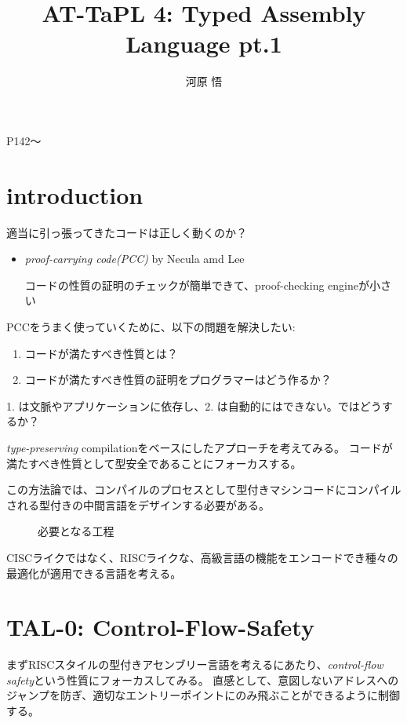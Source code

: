 \documentclass[a4paper,oneside]{ltjsarticle}
\title{AT-TaPL 4: Typed Assembly Language pt.1}
\author{河原 悟}
\begin{document}
\maketitle
P142〜

\setcounter{section}{-1}
\section{introduction}
適当に引っ張ってきたコードは正しく動くのか？
\begin{itemize}
	\item \textit{proof-carrying code(PCC)} by Necula amd Lee

		コードの性質の証明のチェックが簡単できて、proof-checking engineが小さい
\end{itemize}

PCCをうまく使っていくために、以下の問題を解決したい:

\begin{enumerate}
	\item コードが満たすべき性質とは？
	\item コードが満たすべき性質の証明をプログラマーはどう作るか？
\end{enumerate}

1. は文脈やアプリケーションに依存し、2. は自動的にはできない。ではどうするか？

\textit{type-preserving} compilationをベースにしたアプローチを考えてみる。
コードが満たすべき性質として型安全であることにフォーカスする。

この方法論では、コンパイルのプロセスとして型付きマシンコードにコンパイルされる型付きの中間言語をデザインする必要がある。
\begin{figure}[h]
	\centering
	\caption{必要となる工程}
\end{figure}

CISCライクではなく、RISCライクな、高級言語の機能をエンコードでき種々の最適化が適用できる言語を考える。

\section{TAL-0: Control-Flow-Safety}
まずRISCスタイルの型付きアセンブリー言語を考えるにあたり、\textit{control-flow safety}という性質にフォーカスしてみる。
直感として、意図しないアドレスへのジャンプを防ぎ、適切なエントリーポイントにのみ飛ぶことができるように制御する。
\end{document}
